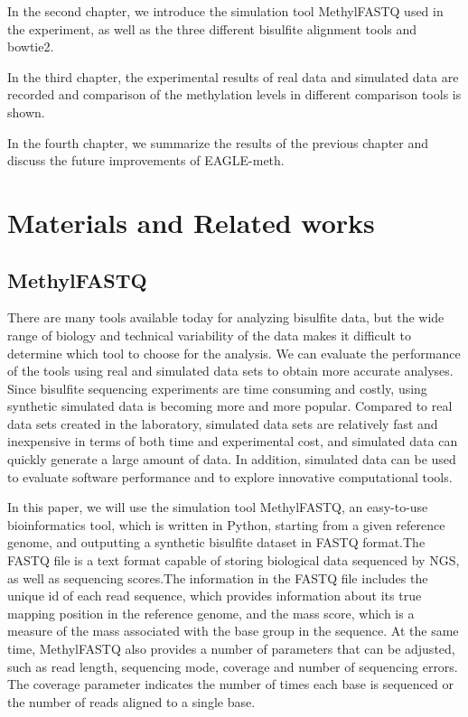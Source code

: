 \documentclass{PHlab-thesis}
\begin{document}
\par 
In the second chapter, we introduce the simulation tool MethylFASTQ used in the experiment, as well as the three different bisulfite alignment tools and bowtie2.

\par
In the third chapter, the experimental results of real data and simulated data are recorded and comparison of the methylation levels in different comparison tools is shown.

\par
In the fourth chapter, we summarize the results of the previous chapter and discuss the future improvements of EAGLE-meth.

\chapter{Materials and Related works}


\section{MethylFASTQ}
There are many tools available today for analyzing bisulfite data, but the wide range of biology and technical variability of the data makes it difficult to determine which tool to choose for the analysis. We can evaluate the performance of the tools using real and simulated data sets to obtain more accurate analyses. Since bisulfite sequencing experiments are time consuming and costly, using synthetic simulated data is becoming more and more popular. Compared to real data sets created in the laboratory, simulated data sets are relatively fast and inexpensive in terms of both time and experimental cost, and simulated data can quickly generate a large amount of data. In addition, simulated data can be used to evaluate software performance and to explore innovative computational tools.

\par
In this paper, we will use the simulation tool MethylFASTQ\cite{piaggeschi2019methylfastq}, an easy-to-use bioinformatics tool, which is written in Python, starting from a given reference genome, and outputting a synthetic bisulfite dataset in FASTQ format.The FASTQ file is a text format capable of storing biological data sequenced by NGS, as well as sequencing scores.The information in the FASTQ file includes the unique id of each read sequence, which provides information about its true mapping position in the reference genome, and the mass score, which is a measure of the mass associated with the base group in the sequence. At the same time, MethylFASTQ also provides a number of parameters that can be adjusted, such as read length, sequencing mode, coverage and number of sequencing errors. The coverage parameter indicates the number of times each base is sequenced or the number of reads aligned to a single base.
\end{document}
